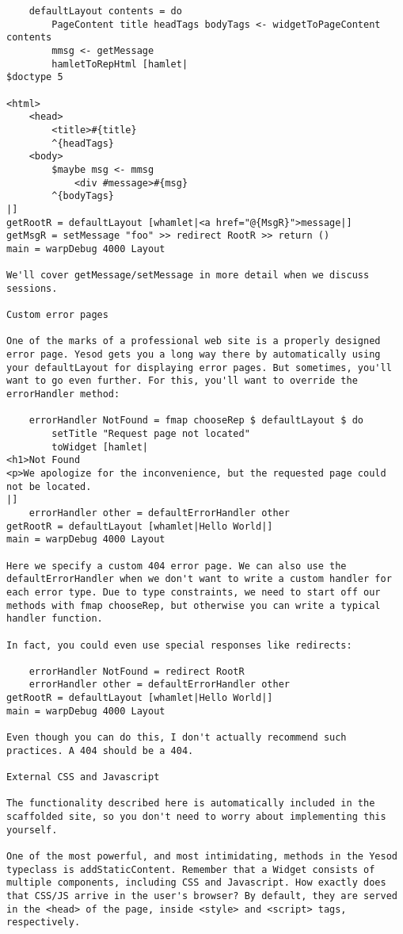 \begin{lstlisting}
    defaultLayout contents = do
        PageContent title headTags bodyTags <- widgetToPageContent contents
        mmsg <- getMessage
        hamletToRepHtml [hamlet|
$doctype 5

<html>
    <head>
        <title>#{title}
        ^{headTags}
    <body>
        $maybe msg <- mmsg
            <div #message>#{msg}
        ^{bodyTags}
|]
getRootR = defaultLayout [whamlet|<a href="@{MsgR}">message|]
getMsgR = setMessage "foo" >> redirect RootR >> return ()
main = warpDebug 4000 Layout

We'll cover getMessage/setMessage in more detail when we discuss sessions.

Custom error pages

One of the marks of a professional web site is a properly designed error page. Yesod gets you a long way there by automatically using your defaultLayout for displaying error pages. But sometimes, you'll want to go even further. For this, you'll want to override the errorHandler method:

    errorHandler NotFound = fmap chooseRep $ defaultLayout $ do
        setTitle "Request page not located"
        toWidget [hamlet|
<h1>Not Found
<p>We apologize for the inconvenience, but the requested page could not be located.
|]
    errorHandler other = defaultErrorHandler other
getRootR = defaultLayout [whamlet|Hello World|]
main = warpDebug 4000 Layout

Here we specify a custom 404 error page. We can also use the defaultErrorHandler when we don't want to write a custom handler for each error type. Due to type constraints, we need to start off our methods with fmap chooseRep, but otherwise you can write a typical handler function.

In fact, you could even use special responses like redirects:

    errorHandler NotFound = redirect RootR
    errorHandler other = defaultErrorHandler other
getRootR = defaultLayout [whamlet|Hello World|]
main = warpDebug 4000 Layout

Even though you can do this, I don't actually recommend such practices. A 404 should be a 404.

External CSS and Javascript

The functionality described here is automatically included in the scaffolded site, so you don't need to worry about implementing this yourself.

One of the most powerful, and most intimidating, methods in the Yesod typeclass is addStaticContent. Remember that a Widget consists of multiple components, including CSS and Javascript. How exactly does that CSS/JS arrive in the user's browser? By default, they are served in the <head> of the page, inside <style> and <script> tags, respectively.


\end{lstlisting}
